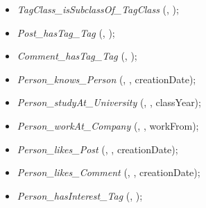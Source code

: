 \begin{itemize}
  \item \emph{TagClass\_isSubclassOf\_TagClass} (, );
  \item \emph{Post\_hasTag\_Tag} (, );
  \item \emph{Comment\_hasTag\_Tag} (, );
  \item \emph{Person\_knows\_Person} (, , creationDate);
  \item \emph{Person\_studyAt\_University} (, , classYear);
  \item \emph{Person\_workAt\_Company} (, , workFrom);
  \item \emph{Person\_likes\_Post} (, , creationDate);
  \item \emph{Person\_likes\_Comment} (, , creationDate);
  \item \emph{Person\_hasInterest\_Tag} (, );
\end{itemize}

